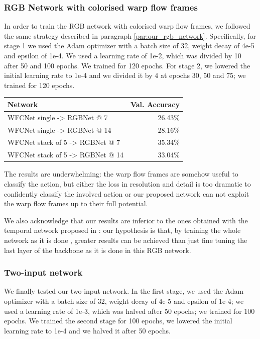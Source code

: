 \documentclass[10pt,twocolumn,letterpaper]{article}
\begin{document}
\subsubsection{RGB Network with colorised warp flow frames}

In order to train the RGB network with colorised warp flow frames, we followed the same strategy described in paragraph \ref{par:our_rgb_network}. Specifically, for stage 1 we used the Adam optimizer with a batch size of 32, weight decay of 4e-5 and epsilon of 1e-4.  We used a learning rate of 1e-2, which was divided by 10 after 50 and 100 epochs. We trained for 120 epochs. For stage 2, we lowered the initial learning rate to 1e-4 and we divided it by 4 at epochs 30, 50 and 75; we trained for 120 epochs.

\vspace{12pt} \noindent
\begin{tabular}{l|r}
	Network & Val. Accuracy \\
	\hline
	WFCNet single -> RGBNet @ 7 & 26.43\% \\
	WFCNet single -> RGBNet @ 14 & 28.16\% \\
	\hline
	WFCNet stack of 5 -> RGBNet @ 7 & 35.34\% \\
	WFCNet stack of 5 -> RGBNet @ 14 & 33.04\% \\
\end{tabular} \vspace{6pt}

The results are underwhelming: the warp flow frames are somehow useful to classify the action, but either the loss in resolution and detail is too dramatic to confidently classify the involved action or our proposed network can not exploit the warp flow frames up to their full potential.

We also acknowledge that our results are inferior to the ones obtained with the temporal network proposed in \cite{Ego-RNN}: our hypothesis is that, by training the whole network as it is done \cite{Ego-RNN}, greater results can be achieved than just fine tuning the last layer of the backbone as it is done in this RGB network.

\subsubsection{Two-input network}

We finally tested our two-input network. In the first stage, we used the Adam optimizer with a batch size of 32, weight decay of 4e-5 and epsilon of 1e-4; we used a learning rate of 1e-3, which was halved after 50 epochs; we trained for 100 epochs. We trained the second stage for 100 epochs, we lowered the initial learning rate to 1e-4 and we halved it after 50 epochs.
\end{document}
